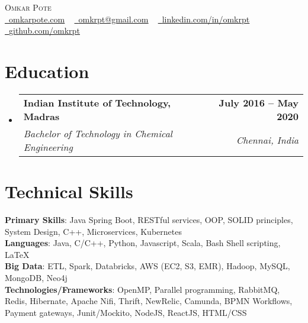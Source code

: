 \documentclass[letterpaper,11pt]{article}
\makeatletter
\newcommand{\resumeSubheading}[4]{
  \vspace{-2pt}\item
    \begin{tabular*}{1.0\textwidth}[t]{l@{\extracolsep{\fill}}r}
      \textbf{#1} & \textbf{\small #2} \\
      \textit{\small#3} & \textit{\small #4} \\
    \end{tabular*}\vspace{-7pt}
}
\newcommand{\resumeSubHeadingListStart}{\begin{itemize}[leftmargin=0.0in, label={}]}
\newcommand{\resumeSubHeadingListEnd}{\end{itemize}}
\makeatother
\begin{document}

\begin{center}
    {\vspace*{30pt} \Huge \scshape Omkar Pote} \\ \vspace{5pt} 
    \small
    \href{omkarpote.com}{\raisebox{-0.2\height}\faGlobe\  \underline{omkarpote.com}} ~ 
    \href{mailto:omkrpt@gmail.com}{\raisebox{-0.2\height}\faEnvelope\  \underline{omkrpt@gmail.com}} ~ 
    \href{https://linkedin.com/in/omkrpt/}{\raisebox{-0.2\height}\faLinkedin\ \underline{linkedin.com/in/omkrpt}}  ~
    \href{https://github.com/omkrpt}{\raisebox{-0.2\height}\faGithub\ \underline{github.com/omkrpt}}
    \vspace{-8pt}
\end{center}


\section{Education}
  \resumeSubHeadingListStart
    \resumeSubheading
      {Indian Institute of Technology, Madras}{July 2016 -- May 2020}
      {Bachelor of Technology in Chemical Engineering}{Chennai, India}
  \resumeSubHeadingListEnd

\section{Technical Skills}
 \begin{itemize}[leftmargin=0.15in, label={}]
    \small{\item{
     \textbf{Primary Skills}{: Java Spring Boot, RESTful services, OOP, SOLID principles, System Design, C++, Microservices, Kubernetes} \\
     \textbf{Languages}{: Java, C/C++, Python, Javascript, Scala, Bash Shell scripting, LaTeX} \\
     \textbf{Big Data}{: ETL, Spark, Databricks, AWS (EC2, S3, EMR), Hadoop, MySQL, MongoDB, Neo4j} \\
     \textbf{Technologies/Frameworks}{: OpenMP, Parallel programming, RabbitMQ, Redis, Hibernate, Apache Nifi, Thrift, NewRelic, Camunda, BPMN Workflows, Payment gateways, Junit/Mockito, NodeJS, ReactJS, HTML/CSS} \\
    }}
 \end{itemize}
 \vspace{-16pt}
\end{document}
